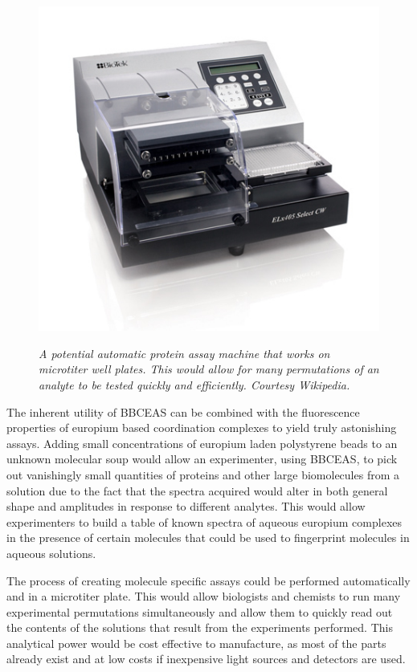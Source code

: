 \begin{figure}
\begin{center}
\includegraphics[width=\marginspace]{figures/microtiter_machine.jpeg}
\end{center}
\emph{\footnotesize{ A potential automatic protein assay machine that works on microtiter well plates. This would allow for many permutations of an analyte to be tested quickly and efficiently. Courtesy Wikipedia.}}
\label{fig:microtiter}
\end{figure}

The inherent utility of \ac{BBCEAS} can be combined with the fluorescence
properties of europium based coordination complexes to yield truly astonishing
assays. Adding small concentrations of europium laden polystyrene beads to
an unknown molecular soup would allow an experimenter, using \ac{BBCEAS}, to
pick out vanishingly small quantities of proteins and other large biomolecules
from a solution due to the fact that the spectra acquired would alter in both
general shape and amplitudes in response to different analytes. This would
allow experimenters to build a table of known spectra of aqueous europium
complexes in the presence of certain molecules that could be used to fingerprint molecules in aqueous solutions.

The process of creating molecule specific assays could be performed
automatically and in a microtiter plate. This would allow biologists and
chemists to run many experimental permutations simultaneously and allow
them to quickly read out the contents of the solutions that result from
the experiments performed. This analytical power would be cost effective
to manufacture, as most of the parts already exist and at low costs if
inexpensive light sources and detectors are used.

